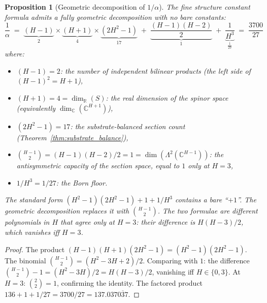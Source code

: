 \documentclass[11pt,a4paper]{article}
\newtheorem{proposition}[theorem]{Proposition}
\theoremstyle{definition}
\theoremstyle{remark}
\newcommand{\C}{\mathbb{C}}
\newcommand{\R}{\mathbb{R}}
\begin{document}
\begin{proposition}[Geometric decomposition of $1/\alpha$]\label{prop:alpha_geometric}
The fine structure constant formula admits a fully geometric decomposition with no bare constants:
\begin{equation}\label{eq:alpha_formula}
\frac{1}{\alpha} \;=\; \underbrace{(H\!-\!1)}_{2}\times\underbrace{(H\!+\!1)}_{4}\times\underbrace{(2H^2\!-\!1)}_{17}\;+\;\underbrace{\frac{(H\!-\!1)(H\!-\!2)}{2}}_{1}\;+\;\underbrace{\frac{1}{H^3}}_{\frac{1}{27}} \;=\; \frac{3700}{27}
\end{equation}
where:
\begin{itemize}[nosep]
\item $(H\!-\!1)=2$: the number of independent bilinear products (the left side of $(H\!-\!1)^2=H\!+\!1$),
\item $(H\!+\!1)=4=\dim_\R(S)$: the real dimension of the spinor space (equivalently $\dim_\C(\C^{H+1})$),
\item $(2H^2\!-\!1)=17$: the substrate-balanced section count (Theorem~\ref{thm:substrate_balance}),
\item $\binom{H-1}{2}=(H\!-\!1)(H\!-\!2)/2=1=\dim(\Lambda^2(\C^{H-1}))$: the antisymmetric capacity of the section space, equal to $1$ only at $H=3$,
\item $1/H^3=1/27$: the Born floor.
\end{itemize}
The standard form $(H^2\!-\!1)(2H^2\!-\!1)+1+1/H^3$ contains a bare ``$+1$''. The geometric decomposition replaces it with $\binom{H-1}{2}$. The two formulae are different polynomials in $H$ that agree only at $H=3$: their difference is $H(H\!-\!3)/2$, which vanishes iff $H=3$.
\end{proposition}

\begin{proof}
The product $(H\!-\!1)(H\!+\!1)(2H^2\!-\!1)=(H^2\!-\!1)(2H^2\!-\!1)$. The binomial $\binom{H-1}{2}=(H^2\!-\!3H\!+\!2)/2$. Comparing with $1$: the difference $\binom{H-1}{2}-1=(H^2\!-\!3H)/2=H(H\!-\!3)/2$, vanishing iff $H\in\{0,3\}$. At $H=3$: $\binom{2}{2}=1$, confirming the identity. The factored product $136+1+1/27=3700/27=137.037\overline{037}$.
\end{proof}
\end{document}
